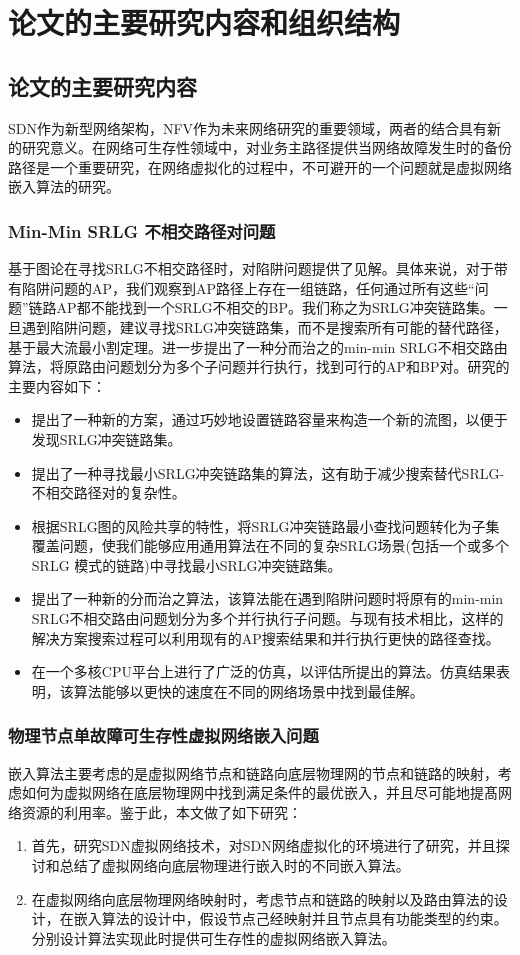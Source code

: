 \section{论文的主要研究内容和组织结构}
\subsection{论文的主要研究内容}
SDN作为新型网络架构，NFV作为未来网络研究的重要领域，两者的结合具有新的研究意义。在网络可生存性领域中，对业务主路径提供当网络故障发生时的备份路径是一个重要研究，在网络虚拟化的过程中，不可避开的一个问题就是虚拟网络嵌入算法的研究。
\subsubsection{Min-Min SRLG 不相交路径对问题}
基于图论在寻找SRLG不相交路径时，对陷阱问题提供了见解。具体来说，对于带有陷阱问题的AP，我们观察到AP路径上存在一组链路，任何通过所有这些“问题”链路AP都不能找到一个SRLG不相交的BP。我们称之为SRLG冲突链路集。一旦遇到陷阱问题，建议寻找SRLG冲突链路集，而不是搜索所有可能的替代路径，基于最大流最小割定理\cite{ford2015flows}。进一步提出了一种分而治之的min-min SRLG不相交路由算法，将原路由问题划分为多个子问题并行执行，找到可行的AP和BP对。研究的主要内容如下：
\begin{itemize}
  \item 提出了一种新的方案，通过巧妙地设置链路容量来构造一个新的流图，以便于发现SRLG冲突链路集。
  \item 提出了一种寻找最小SRLG冲突链路集的算法，这有助于减少搜索替代SRLG- 不相交路径对的复杂性。
  \item 根据SRLG图的风险共享的特性，将SRLG冲突链路最小查找问题转化为子集覆盖问题，使我们能够应用通用算法在不同的复杂SRLG场景(包括一个或多个SRLG 模式的链路)中寻找最小SRLG冲突链路集。
  \item 提出了一种新的分而治之算法，该算法能在遇到陷阱问题时将原有的min-min SRLG不相交路由问题划分为多个并行执行子问题。与现有技术相比，这样的解决方案搜索过程可以利用现有的AP搜索结果和并行执行更快的路径查找。
  \item 在一个多核CPU平台上进行了广泛的仿真，以评估所提出的算法。仿真结果表明，该算法能够以更快的速度在不同的网络场景中找到最佳解。
\end{itemize}

\subsubsection{物理节点单故障可生存性虚拟网络嵌入问题}
嵌入算法主要考虑的是虚拟网络节点和链路向底层物理网的节点和链路的映射，考虑如何为虚拟网络在底层物理网中找到满足条件的最优嵌入，并且尽可能地提髙网络资源的利用率。鉴于此，本文做了如下研究：
\begin{enumerate}
  \item 首先，研究SDN虚拟网络技术，对SDN网络虚拟化的环境进行了研究，并且探讨和总结了虚拟网络向底层物理进行嵌入时的不同嵌入算法。
  \item 在虚拟网络向底层物理网络映射时，考虑节点和链路的映射以及路由算法的设计，在嵌入算法的设计中，假设节点己经映射并且节点具有功能类型的约束。分别设计算法实现此时提供可生存性的虚拟网络嵌入算法。
\end{enumerate}

